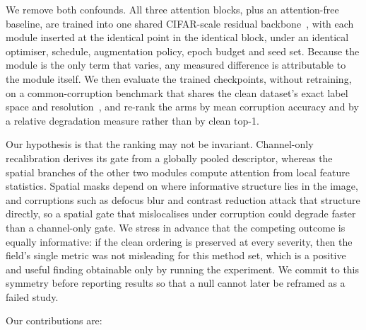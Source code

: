 We remove both confounds. All three attention blocks, plus an attention-free
baseline, are trained into one shared CIFAR-scale residual
backbone~\cite{he2016deep}, with each module inserted at the identical point in
the identical block, under an identical optimiser, schedule, augmentation
policy, epoch budget and seed set. Because the module is the only term that
varies, any measured difference is attributable to the module itself. We then
evaluate the trained checkpoints, without retraining, on a common-corruption
benchmark that shares the clean dataset's exact label space and
resolution~\cite{hendrycks2019benchmarking,krizhevsky2009learning}, and re-rank
the arms by mean corruption accuracy and by a relative degradation measure
rather than by clean top-1.

Our hypothesis is that the ranking may not be invariant. Channel-only
recalibration derives its gate from a globally pooled descriptor, whereas the
spatial branches of the other two modules compute attention from local feature
statistics. Spatial masks depend on where informative structure lies in the
image, and corruptions such as defocus blur and contrast reduction attack that
structure directly, so a spatial gate that mislocalises under corruption could
degrade faster than a channel-only gate. We stress in advance that the
competing outcome is equally informative: if the clean ordering is preserved at
every severity, then the field's single metric was not misleading for this
method set, which is a positive and useful finding obtainable only by running
the experiment. We commit to this symmetry before reporting results so that a
null cannot later be reframed as a failed study.

Our contributions are:

